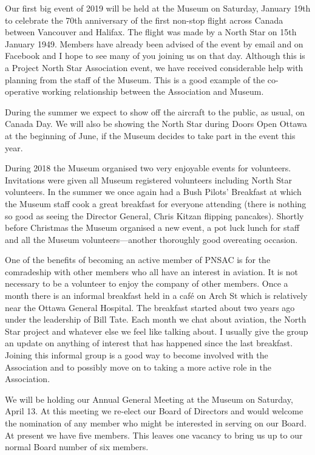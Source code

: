 Our first big event of 2019 will be held at the Museum on Saturday, January
19th to celebrate the 70th anniversary of the first non-stop flight across
Canada between Vancouver and Halifax. The flight was made by a North Star on
15th January 1949. Members have already been advised of the event by email and
on Facebook and I hope to see many of you joining us on that day. Although this
is a Project North Star Association event, we have received considerable help
with planning from the staff of the Museum. This is a good example of the
co-operative working relationship between the Association and Museum.

During the summer we expect to show off the aircraft to the public, as usual,
on Canada Day. We will also be showing the North Star during Doors Open Ottawa
at the beginning of June, if the Museum decides to take part in the event this
year.

During 2018 the Museum organised two very enjoyable events for volunteers.
Invitations were given all Museum registered volunteers including North Star
volunteers. In the summer we once again had a Bush Pilots' Breakfast at which
the Museum staff cook a great breakfast for everyone attending (there is
nothing so good as seeing the Director General, Chris Kitzan flipping
pancakes). Shortly before Christmas the Museum organised a new event, a pot
luck lunch for staff and all the Museum volunteers---another thoroughly good
overeating occasion.

One of the benefits of becoming an active member of PNSAC is for the
comradeship with other members who all have an interest in aviation. It is not
necessary to be a volunteer to enjoy the company of other members. Once a month
there is an informal breakfast held in a caf\'{e} on Arch St which is relatively
near the Ottawa General Hospital. The breakfast started about two years ago
under the leadership of Bill Tate. Each month we chat about aviation, the North
Star project and whatever else we feel like talking about. I usually give the
group an update on anything of interest that has happened since the last
breakfast. Joining this informal group is a good way to become involved with
the Association and to possibly move on to taking a more active role in the
Association.

We will be holding our Annual General Meeting at the Museum on Saturday, April
13. At this meeting we re-elect our Board of Directors and would welcome the
nomination of any member who might be interested in serving on our Board. At
present we have five members. This leaves one vacancy to bring us up to our
normal Board number of six members.

